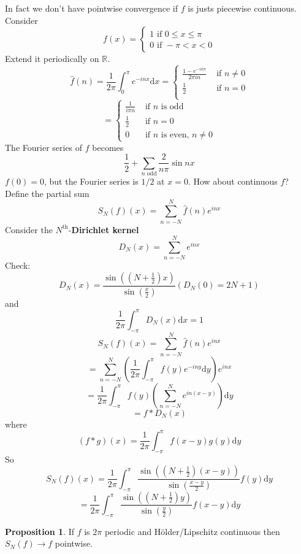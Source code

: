 \documentclass{article}
\theoremstyle{definition}
\newtheorem{prop}{Proposition}
\begin{document}
In fact we don't have pointwise convergence if $f$ is justs piecewise continuous.
Consider 
\[
	f(x) = 
	\begin{cases}
		1 \text{ if } 0 \leq x \leq \pi\\
		0 \text{ if } - \pi < x < 0
	\end{cases}
\]
Extend it periodically on $\mathbb{R}$.
\[
	\hat{f}(n) = \frac{1}{2 \pi} \int_0^\pi e^{-inx} \mathrm{d} x = 
	\begin{cases}
		\frac{1 - e^{-in \pi}}{2 \pi i n} & \text{ if } n \neq 0\\
		\frac{1}{2} & \text{ if } n = 0\\
	\end{cases}
\]
\[
	= 
	\begin{cases}
		\frac{1}{i \pi n} & \text{ if } n \text{ is odd}\\
		\frac{1}{2} & \text{ if } n = 0\\
		0 & \text{ if } n \text{ is even, } n \neq 0
	\end{cases}
\]
The Fourier series of $f$ becomes
\[
	\frac{1}{2} + \sum_{n \text{ odd}} \frac{2}{n \pi} \sin nx
\]
$f(0) = 0$, but the Fourier series is $1/2$ at $x = 0$.
How about continuous $f$?
Define the partial sum
\[
	S_N(f)(x) = \sum_{n = -N}^N \hat{f}(n) e^{inx}
\]
Consider the $N^{\text{th}}$-\textbf{Dirichlet kernel}
\[
	D_N(x) = \sum_{n = -N}^N e^{inx}
\]
Check:
\[
	D_N(x) = \frac{\sin \left(\left(N + \frac{1}{2} \right) x \right)}{\sin \left( \frac{x}{2} \right)}  (D_N(0) = 2N + 1)
\]
and
\[
	\frac{1}{2 \pi} \int_{-\pi}^\pi D_N(x) \mathrm{d} x = 1
\]
\[
	S_N(f)(x) = \sum_{n = -N}^N \hat{f}(n) e^{inx}
\]
\[
	= \sum_{n = -N}^N \left( \frac{1}{2 \pi} \int_{-\pi}^\pi f(y) e^{-iny} \mathrm{d} y \right) e^{inx}
\]
\[
	= \frac{1}{2 \pi} \int_{- \pi}^\pi f(y) \left( \sum_{n = -N}^N e^{in (x - y)} \right) \mathrm{d} y
\]
\[
	= f * D_N(x)
\]
where 
\[
	(f*g)(x) = \frac{1}{2 \pi} \int_{- \pi}^\pi f(x - y) g(y) \mathrm{d}y
\]
So
\[
	S_N(f)(x) = \frac{1}{2 \pi} \int_{- \pi}^\pi \frac{\sin \left( \left(N + \frac{1}{2} \right) \left( x - y \right) \right)}{\sin \left(\frac{x - y}{2} \right)} f(y) \mathrm{d} y
\]
\[
	= \frac{1}{2 \pi} \int_{- \pi}^\pi \frac{\sin \left( \left( N + \frac{1}{2} \right) y \right)}{\sin \left( \frac{y}{2} \right)} f(x - y) \mathrm{d} y
\]

\begin{prop}
	If $f$ is $2 \pi$ periodic and H\"older/Lipschitz continuous then $S_N(f) \to f$ pointwise.
\end{prop}
\end{document}
